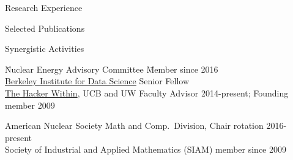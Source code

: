 \documentclass{resume3} %
\begin{document}
\begin{rSection}{Research Experience}
%

\end{rSection}

\begin{rSection}{Selected Publications}

\end{rSection}

\vspace*{0.5em}
\begin{rSection}{Synergistic Activities}
\begin{tabbing}
\= Nuclear Energy Advisory Committee \hspace*{3em} \= Member since 2016\\
%
\>\href{http://bids.berkeley.edu/}{Berkeley Institute for Data Science} \> Senior Fellow\\
%
\> \href{http://thehackerwithin.github.io/berkeley/}{The Hacker Within}, UCB and UW  \> Faculty Advisor 2014-present; Founding member 2009%
%
%
\end{tabbing}
\vspace*{-.5em}
American Nuclear Society Math and Comp.\ Division, Chair rotation 2016-present\\
Society of Industrial and Applied Mathematics (SIAM) member since 2009 
\end{rSection}
\vspace*{-.5em}
\end{document}

